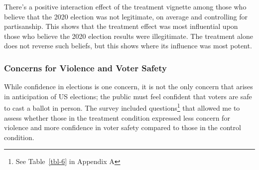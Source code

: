 \documentclass[
  12pt,
  letterpaper,
]{article}
\begin{document}
There's a positive interaction effect of the treatment vignette among
those who believe that the 2020 election was not legitimate, on average
and controlling for partisanship. This shows that the treatment effect
was most influential upon those who believe the 2020 election results
were illegitimate. The treatment alone does not reverse such beliefs,
but this shows where its influence was most potent.

\subsubsection{Concerns for Violence and Voter
Safety}\label{concerns-for-violence-and-voter-safety}

While confidence in elections is one concern, it is not the only concern
that arises in anticipation of US elections; the public must feel
confident that voters are safe to cast a ballot in person. The survey
included questions\footnote{See Table~\ref{tbl-6} in Appendix A} that
allowed me to assess whether those in the treatment condition expressed
less concern for violence and more confidence in voter safety compared
to those in the control condition.
\end{document}
